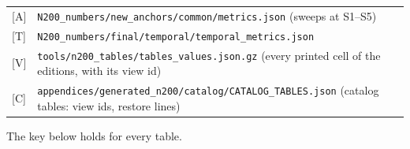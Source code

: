 {{\begin{tabular}{@{}l>{\raggedright\arraybackslash}p{\dimexpr\linewidth-4em\relax}@{}}
  {[A]} & \texttt{N200\_numbers/\allowbreak{}new\_anchors/\allowbreak{}common/\allowbreak{}metrics.json} (sweeps at S1--S5)\\
  {[T]} & \texttt{N200\_numbers/\allowbreak{}final/\allowbreak{}temporal/\allowbreak{}temporal\_metrics.json}\\
  {[V]} & \texttt{tools/\allowbreak{}n200\_tables/\allowbreak{}tables\_values.json.gz} (every printed cell of the editions, with its view id)\\
  {[C]} & \texttt{appendices/\allowbreak{}generated\_n200/\allowbreak{}catalog/\allowbreak{}CATALOG\_TABLES.json} (catalog tables: view ids, restore lines)
  \end{tabular}\par\medskip
  The key below holds for every table.\par}\medskip
  \par\clearpage}
